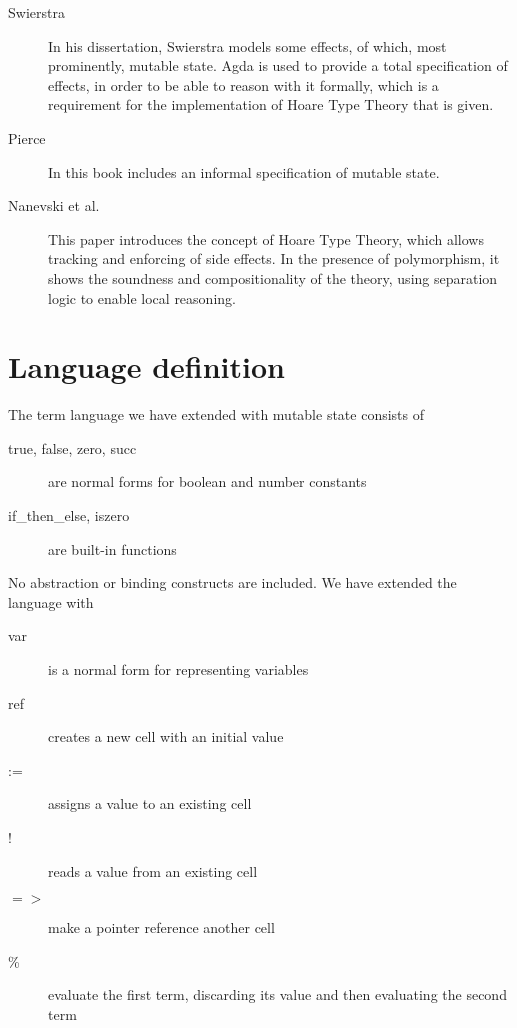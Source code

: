 \documentclass{article}
\begin{document}
\begin{description}
\item[Swierstra]\hfill

In his dissertation, Swierstra models some effects, of which, most prominently, mutable state. Agda is used to provide a total specification of effects, in order to be able to reason with it formally, which is a requirement for the implementation of Hoare Type Theory that is given.

\item[Pierce]\hfill

In this book includes an informal specification of mutable state.

\item[Nanevski et al.]\hfill

This paper introduces the concept of Hoare Type Theory, which allows tracking and enforcing of side effects. In the presence of polymorphism, it shows the soundness and compositionality of the theory, using separation logic to enable local reasoning.

\end{description}



\section{Language definition}\label{sec:def}

The term language we have extended with mutable state consists of
\begin{description}
\item[true, false, zero, succ] are normal forms for boolean and number constants
\item[if\_then\_else, iszero] are built-in functions
\end{description}

No abstraction or binding constructs are included.
We have extended the language with
\begin{description}
\item[var] is a normal form for representing variables
\item[ref] creates a new cell with an initial value
\item[:=] assigns a value to an existing cell
\item[!] reads a value from an existing cell
\item[$\mathbf{=>}$] make a pointer reference another cell
\item[\%] evaluate the first term, discarding its value and then evaluating the second term
\end{description}
\end{document}
